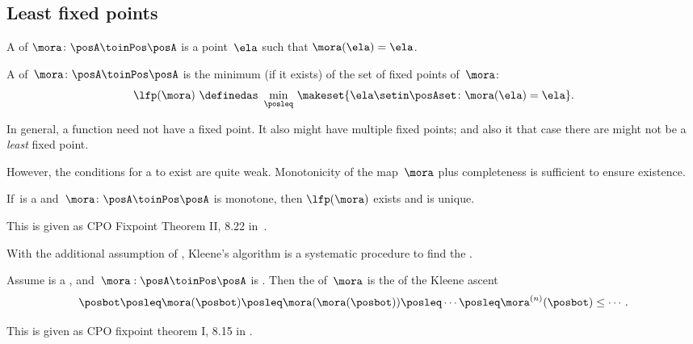 \subsection{Least fixed points}

\begin{definition}
    \label{def:fixed-point}
    A  of $\mora\colon\posA\toinPos\posA$ is a point~$\ela$ such that $\mora(\ela)=\ela$.
\end{definition}

\begin{definition}
    \label{def:least-fixed}
    A  of~$\mora\colon\posA\toinPos\posA$ is the minimum (if it exists) of the set of fixed points of~$\mora$:
    \begin{equation}
        \label{eq:lfp-one}
        \lfp(\mora)\,\,\definedas\,\,\min_{\posleq}\,\makeset{\ela \setin\posAset \colon \mora(\ela)=\ela}.
    \end{equation}
\end{definition}

In general, a function need not have a fixed point.
It also might have multiple fixed points; and also it that case there are might not be a \emph{least} fixed point.

However, the conditions for a  to exist are quite weak.
%
Monotonicity of the map~$\mora$ plus completeness is sufficient to ensure existence.

\begin{lemma}
    \label{lem:CPO-fix-point-2}
    If~\posA is a \CPO and~$\mora\colon\posA\toinPos\posA$ is monotone, then $\lfp(\mora)$ exists and is unique.
\end{lemma}
This is given as CPO Fixpoint Theorem II, 8.22 in~\cite{davey02}.

With the additional assumption of , Kleene's algorithm is a systematic procedure to find the .

\begin{lemma}
    \label{lem:kleene-1}
    Assume \posA is a \CPO, and~$\mora:\linebreak[0]\posA\toinPos\posA$ is .
    Then the  of~$\mora$ is the  of the Kleene ascent  \begin{equation}
        \label{eq:kleene-iteration}
        \posbot\posleq \mora(\posbot)\posleq \mora(\mora(\posbot))\posleq\cdots\posleq \mora^{(n)}(\posbot)\leq\cdots.
    \end{equation}
\end{lemma}
This is given as CPO fixpoint theorem I, 8.15 in \cite{davey02}.

